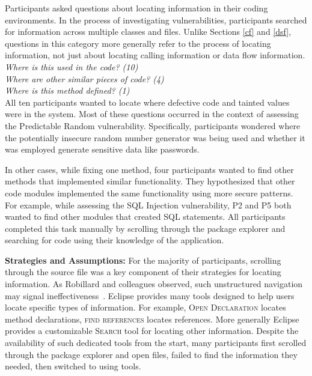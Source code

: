 \documentclass[10pt,journal,compsoc]{IEEEtran}
\begin{document}
Participants asked questions about locating information in their coding environments.
In the process of investigating vulnerabilities, participants searched for information across multiple classes and files.
Unlike Sections \ref{cf} and \ref{dsf}, questions in this category more generally refer to the process of locating information, not just about locating calling information or data flow information.
\\

\noindent\emph{Where is this used in the code? (10)} \\
\emph{Where are other similar pieces of code? (4)} \\
\emph{Where is this method defined? (1)} 
\\

All ten participants wanted to locate where defective code and tainted values were in the system. 
Most of these questions occurred in the context of assessing the Predictable Random vulnerability.
Specifically, participants wondered where the potentially insecure random number generator was being used and whether it was employed generate sensitive data like passwords.

In other cases, while fixing one method, four participants wanted to find other methods that implemented similar functionality.
They hypothesized that other code modules implemented the same functionality using more secure patterns. 
For example, while assessing the SQL Injection vulnerability, P2 and P5 both wanted to find other modules that created SQL statements.
All participants completed this task manually by scrolling through the package explorer and searching for code using their knowledge of the application.



\textbf{Strategies and Assumptions:}
For the majority of participants, scrolling through the source file was a key component of their strategies for locating information.
As Robillard and colleagues observed, such unstructured navigation may signal ineffectiveness~\cite{robillard2004effective}.
Eclipse provides many tools designed to help users locate specific types of information.
For example, \textsc{Open Declaration} locates method declarations, \textsc{find references} locates references.
More generally Eclipse provides a customizable \textsc{Search} tool for locating other information.
Despite the availability of such dedicated tools from the start, many participants first scrolled through the package explorer and open files, failed to find the information they needed, then switched to using tools. 
\end{document}
